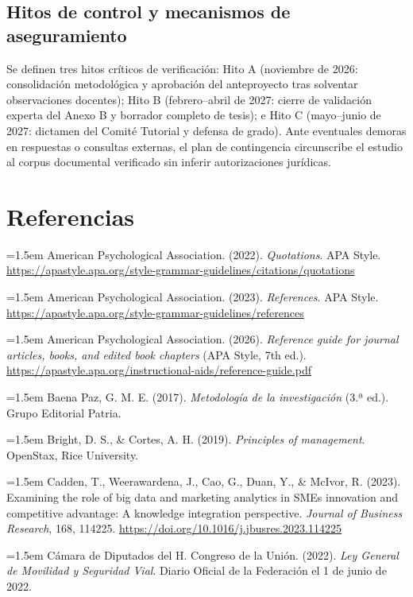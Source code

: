 {\subsection{Hitos de control y mecanismos de aseguramiento}
Se definen tres hitos críticos de verificación: Hito A (noviembre de 2026: consolidación metodológica y aprobación del anteproyecto tras solventar observaciones docentes); Hito B (febrero--abril de 2027: cierre de validación experta del Anexo B y borrador completo de tesis); e Hito C (mayo--junio de 2027: dictamen del Comité Tutorial y defensa de grado). Ante eventuales demoras en respuestas o consultas externas, el plan de contingencia circunscribe el estudio al corpus documental verificado sin inferir autorizaciones jurídicas.

\clearpage\section*{Referencias}
\begingroup\small
\setlength{\parindent}{0pt}
\setlength{\parskip}{4pt}
\hangindent=1.5em American Psychological Association. (2022). \textit{Quotations}. APA Style. \url{https://apastyle.apa.org/style-grammar-guidelines/citations/quotations}

\hangindent=1.5em American Psychological Association. (2023). \textit{References}. APA Style. \url{https://apastyle.apa.org/style-grammar-guidelines/references}

\hangindent=1.5em American Psychological Association. (2026). \textit{Reference guide for journal articles, books, and edited book chapters} (APA Style, 7th ed.). \url{https://apastyle.apa.org/instructional-aids/reference-guide.pdf}

\hangindent=1.5em Baena Paz, G. M. E. (2017). \textit{Metodología de la investigación} (3.ª ed.). Grupo Editorial Patria.

\hangindent=1.5em Bright, D. S., \& Cortes, A. H. (2019). \textit{Principles of management}. OpenStax, Rice University.

\hangindent=1.5em Cadden, T., Weerawardena, J., Cao, G., Duan, Y., \& McIvor, R. (2023). Examining the role of big data and marketing analytics in SMEs innovation and competitive advantage: A knowledge integration perspective. \textit{Journal of Business Research}, 168, 114225. \url{https://doi.org/10.1016/j.jbusres.2023.114225}

\hangindent=1.5em Cámara de Diputados del H. Congreso de la Unión. (2022). \textit{Ley General de Movilidad y Seguridad Vial}. Diario Oficial de la Federación el 1 de junio de 2022.

}
